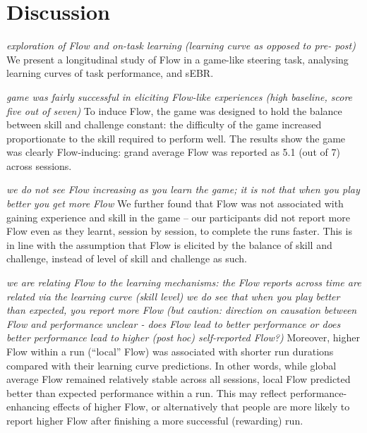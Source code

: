 \documentclass[fleqn,10pt]{wlscirep}
\begin{document}
\section*{Discussion}

\textit{exploration of Flow and on-task learning (learning curve as opposed to pre- post)}
We present a longitudinal study of Flow in a game-like steering task, analysing learning curves of task performance, and sEBR.

\textit{game was fairly successful in eliciting Flow-like experiences (high baseline, score five out of seven)}
To induce Flow, the game was designed to hold the balance between skill and challenge constant: the difficulty of the game increased proportionate to the skill required to perform well. The results show the game was clearly Flow-inducing: grand average Flow was reported as 5.1 (out of 7) across sessions.

\textit{we do not see Flow increasing as you learn the game; it is not that when you play better you get more Flow}
We further found that Flow was not associated with gaining experience and skill in the game -- our participants did not report more Flow even as they learnt, session by session, to complete the runs faster. This is in line with the assumption that Flow is elicited by the balance of skill and challenge, instead of level of skill and challenge as such.

\textit{we are relating Flow to the learning mechanisms: the Flow reports across time are related via the learning curve (skill level)}
\textit{we do see that when you play better than expected, you report more Flow (but caution: direction on causation between Flow and performance unclear - does Flow lead to better performance or does better performance lead to higher (post hoc) self-reported Flow?)}
Moreover, higher Flow within a run (“local” Flow) was associated with shorter run durations compared with their learning curve predictions. In other words, while global average Flow remained relatively stable across all sessions, local Flow predicted better than expected performance within a run. This may reflect performance-enhancing effects of higher Flow, or alternatively that people are more likely to report higher Flow after finishing a more successful (rewarding) run.
\end{document}
